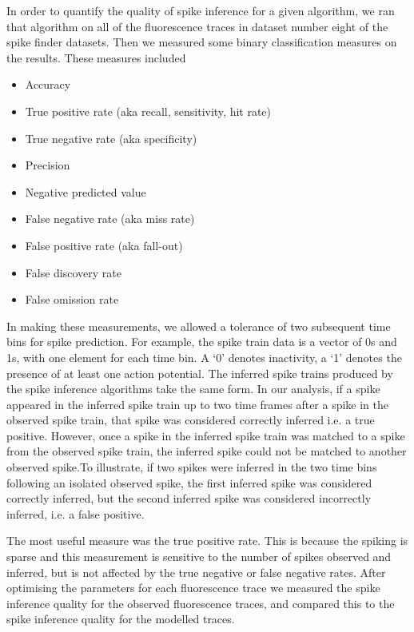 \documentclass[a4paper,12pt]{article}
\theoremstyle{definition}
\begin{document}
In order to quantify the quality of spike inference for a given algorithm, we ran that algorithm on all of the fluorescence traces in dataset number eight of the spike finder datasets. Then we measured some binary classification measures on the results. These measures included
\begin{itemize}
    \item Accuracy
    \item True positive rate (aka recall, sensitivity, hit rate)
    \item True negative rate (aka specificity)
    \item Precision
    \item Negative predicted value
    \item False negative rate (aka miss rate)
    \item False positive rate (aka fall-out)
    \item False discovery rate
    \item False omission rate
\end{itemize}
In making these measurements, we allowed a tolerance of two subsequent time bins for spike prediction. For example, the spike train data is a vector of 0s and 1s, with one element for each time bin. A `0' denotes inactivity, a `1' denotes the presence of at least one action potential. The inferred spike trains produced by the spike inference algorithms take the same form. In our analysis, if a spike appeared in the inferred spike train up to two time frames after a spike in the observed spike train, that spike was considered correctly inferred i.e. a true positive. However, once a spike in the inferred spike train was matched to a spike from the observed spike train, the inferred spike could not be matched to another observed spike.To illustrate, if two spikes were inferred in the two time bins following an isolated observed spike, the first inferred spike was considered correctly inferred, but the second inferred spike was considered incorrectly inferred, i.e. a false positive.

The most useful measure was the true positive rate. This is because the spiking is sparse and this measurement is sensitive to the number of spikes observed and inferred, but is not affected by the true negative or false negative rates. After optimising the parameters for each fluorescence trace we measured the spike inference quality for the observed fluorescence traces, and compared this to the spike inference quality for the modelled traces.
\end{document}
